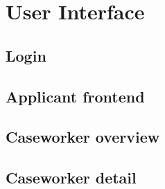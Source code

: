 \section{User Interface}

\subsection{Login}



\subsection{Applicant frontend}

\subsection{Caseworker overview}

\subsection{Caseworker detail}
